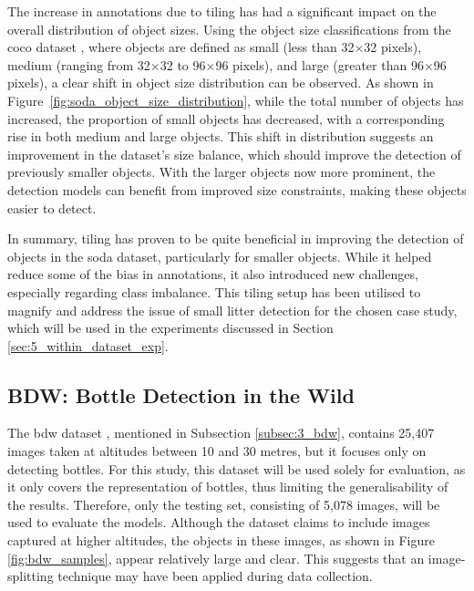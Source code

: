 The increase in annotations due to tiling has had a significant impact on the overall distribution of object sizes. Using the object size classifications from the \gls{coco} dataset \cite{coco}, where objects are defined as small (less than 32$\times$32 pixels), medium (ranging from 32$\times$32 to 96$\times$96 pixels), and large (greater than 96$\times$96 pixels), a clear shift in object size distribution can be observed. As shown in Figure~\ref{fig:soda_object_size_distribution}, while the total number of objects has increased, the proportion of small objects has decreased, with a corresponding rise in both medium and large objects. This shift in distribution suggests an improvement in the dataset’s size balance, which should improve the detection of previously smaller objects. With the larger objects now more prominent, the detection models can benefit from improved size constraints, making these objects easier to detect.



In summary, tiling has proven to be quite beneficial in improving the detection of objects in the \gls{soda} dataset, particularly for smaller objects. While it helped reduce some of the bias in annotations, it also introduced new challenges, especially regarding class imbalance. This tiling setup has been utilised to magnify and address the issue of small litter detection for the chosen case study, which will be used in the experiments discussed in Section \ref{sec:5_within_dataset_exp}.


\subsection{BDW: Bottle Detection in the Wild}
\label{subsec:4_bdw}

The \gls{bdw} dataset \cite{bdwdataset}, mentioned in Subsection \ref{subsec:3_bdw}, contains 25,407 images taken at altitudes between 10 and 30 metres, but it focuses only on detecting bottles. For this study, this dataset will be used solely for evaluation, as it only covers the representation of bottles, thus limiting the generalisability of the results. Therefore, only the testing set, consisting of 5,078 images, will be used to evaluate the models. Although the dataset claims to include images captured at higher altitudes, the objects in these images, as shown in Figure \ref{fig:bdw_samples}, appear relatively large and clear. This suggests that an image-splitting technique may have been applied during data collection.

